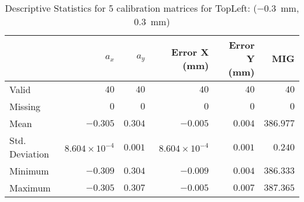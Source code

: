 \begin{table}[h]
    \vspace{10pt}

    \begin{subtable}{\textwidth}
        \centering
        \footnotesize
        \begin{tabular}{lrrrrr}
            \toprule
                & $a_x$ & $a_y$ & Error X (mm) & Error Y (mm) & MIG  \\
            \midrule
			Valid & $40$ & $40$ & $40$ & $40$ & $40$  \\
			Missing & $0$ & $0$ & $0$ & $0$ & $0$  \\
			Mean & $-0.305$ & $0.304$ & $-0.005$ & $0.004$ & $386.977$  \\
			Std. Deviation & $8.604\times10^{-4}$ & $0.001$ & $8.604\times10^{-4}$ & $0.001$ & $0.240$  \\
			Minimum & $-0.309$ & $0.304$ & $-0.009$ & $0.004$ & $386.333$  \\
			Maximum & $-0.305$ & $0.307$ & $-0.005$ & $0.007$ & $387.365$  \\
            \bottomrule
        \end{tabular}
        \caption{$T_{Avg}$}
        \label{subtable:t_avg}
        \end{subtable}

    \caption{Descriptive Statistics for 5 calibration matrices for \textsf{TopLeft:} (\SI{-0.3}{\milli\meter}, \SI{0.3}{\milli\meter})}
    \label{table:stats_matrix_topleft}
\end{table}

